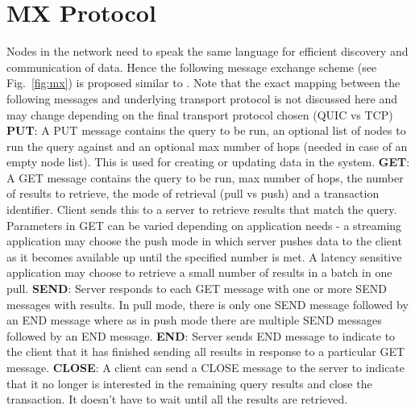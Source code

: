\documentclass[preprint,10pt]{elsarticle}
\newcommand{\figref}[1]{Fig.~\ref{#1}}
\begin{document}
\section{MX Protocol}
Nodes in the network need to speak the same language for efficient discovery and communication of data. Hence the following message exchange scheme (see \figref{fig:mx}) is proposed similar to \cite{Protocol_Spec}. Note that the exact mapping between the following messages and underlying transport protocol is not discussed here and may change depending on the final transport protocol chosen (QUIC vs TCP)
\newline
\newline
\textbf{PUT}:  A PUT message contains the query to be run, an optional list of nodes to run the query against and an optional max number of hops (needed in case of an empty node list). This is used for creating or updating data in the system.
\newline
\newline
\textbf{GET}: A GET message contains the query to be run, max number of hops, the number of results to retrieve, the mode of retrieval (pull vs push) and a transaction identifier. Client sends this to a server to retrieve results that match the query. Parameters in GET can be varied depending on application needs - a streaming application may choose the push mode in which server pushes data to the client as it becomes available up until the specified number is met. A latency sensitive application may choose to retrieve a small number of results in a batch in one pull.
\newline
\newline
\textbf{SEND}: Server responds to each GET message with one or more SEND messages with results. In pull mode, there is only one SEND message followed by an END message where as in push mode there are multiple SEND messages followed by an END message.
\newline
\newline
\textbf{END}: Server sends END message to indicate to the client that it has finished sending all results in response to a particular GET message.
\newline
\newline
\textbf{CLOSE}: A client can send a CLOSE message to the server to indicate that it no longer is interested in the remaining query results and close the transaction. It doesn't have to wait until all the results are retrieved.
\newline
\newline
\end{document}
